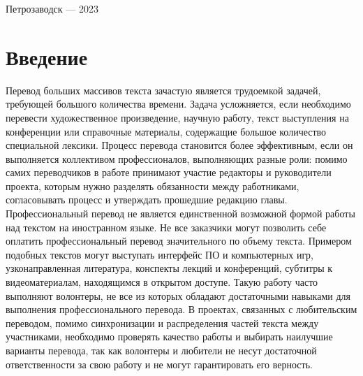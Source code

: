 \documentclass[a4paper,12pt]{article}
\begin{document}
\vfill

\begin{center}
\large
    Петрозаводск --- 2023
\end{center}




\newpage

\tableofcontents




\newpage
\section*{Введение}

Перевод больших массивов текста зачастую является трудоемкой задачей, требующей большого количества времени. Задача усложняется, если необходимо перевести художественное произведение, научную работу, текст выступления на конференции или справочные материалы, содержащие большое количество специальной лексики. Процесс перевода становится более эффективным, если он выполняется коллективом профессионалов, выполняющих разные роли: помимо самих переводчиков в работе принимают участие редакторы и руководители проекта, которым нужно разделять обязанности между работниками, согласовывать процесс и утверждать прошедшие редакцию главы. \\

Профессиональный перевод не является единственной возможной формой работы над текстом на иностранном языке. Не все заказчики могут позволить себе оплатить профессиональный перевод значительного по объему текста. Примером подобных текстов могут выступать интерфейс ПО и компьютерных игр, узконаправленная литература, конспекты лекций и конференций, субтитры к видеоматериалам, находящимся в открытом доступе. Такую работу часто выполняют волонтеры, не все из которых обладают достаточными навыками для выполнения профессионального перевода. В проектах, связанных с любительским переводом, помимо синхронизации и распределения частей текста между участниками, необходимо проверять качество работы и выбирать наилучшие варианты перевода, так как волонтеры и любители не несут достаточной ответственности за свою работу и не могут гарантировать его верность. \\
\end{document}
